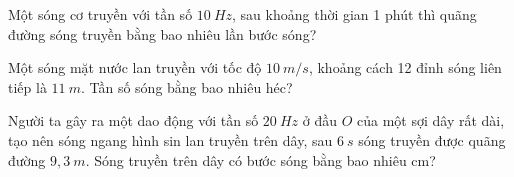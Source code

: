 \setcounter{ex}{0}
\PhanIII
\begin{ex}
Một sóng cơ truyền với tần số $10 ~Hz$, sau khoảng thời gian 1 phút thì quãng đường sóng truyền bằng bao nhiêu lần bước sóng?
\end{ex} 
\begin{ex}
Một sóng mặt nước lan truyền với tốc độ $10 ~m/s$, khoảng cách 12 đỉnh sóng liên tiếp là $11 ~m$. Tần số sóng bằng bao nhiêu héc?
\end{ex} 
\begin{ex}
Người ta gây ra một dao động với tần số $20 ~Hz$ ở đầu $O$ của một sợi dây rất dài, tạo nên sóng ngang hình sin lan truyền trên dây, sau $6 ~s$ sóng truyền được quãng đường $9,3 ~m$. Sóng truyền trên dây có bước sóng bằng bao nhiêu cm?\\ 
\end{ex} 

